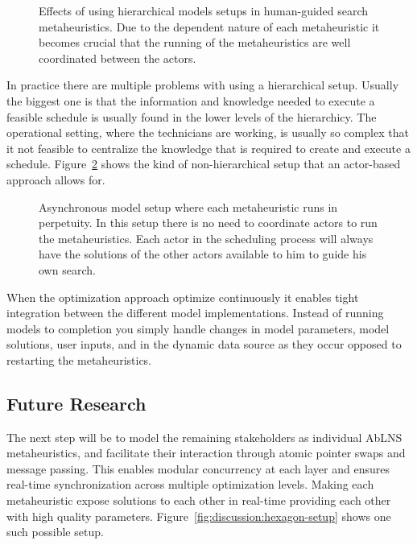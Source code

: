 \begin{figure}[H]
	\label{fig:discussion:hierarchical_model_setup}
	\caption{Effects of using hierarchical models setups in human-guided search metaheuristics.
	Due to the dependent nature of each metaheuristic it becomes crucial that the running of 
	the metaheuristics are well coordinated between the actors.}
\end{figure}

In practice there are multiple problems with using a hierarchical setup.
Usually the biggest one is that the information and knowledge needed to 
execute a feasible schedule is usually found in the lower levels of the 
hierarchicy. The operational setting, where the
technicians are working, is usually so complex that it not feasible to 
centralize the knowledge that is required to create and execute a 
schedule. Figure~\ref{fig:discussion:asynchronous_setup}
shows the kind of non-hierarchical setup that an actor-based approach 
allows for.

\begin{figure}[H]
	
	\caption{Asynchronous model setup where each metaheuristic runs in perpetuity. In this setup
		there is no need to coordinate actors to run the metaheuristics. Each actor in the 
		scheduling process will always have the solutions of the other actors available to 
		him to guide his own search.
	}\label{fig:discussion:asynchronous_setup}
\end{figure}

When the optimization approach optimize continuously it enables tight
integration between the different model implementations. Instead of running
models to completion you simply handle changes in model parameters, model
solutions, user inputs, and in the dynamic data source as they occur opposed to
restarting the metaheuristics.

\subsection{Future Research}\label{sec:discussion:future_research}
The next step will be to model the remaining stakeholders as individual AbLNS
metaheuristics, and facilitate their interaction through atomic pointer swaps
and message passing. This enables modular concurrency at each layer and ensures
real-time synchronization across multiple optimization levels. Making each
metaheuristic expose solutions to each  other in real-time providing each other
with high quality parameters.  Figure~\ref{fig:discussion:hexagon-setup} shows
one such possible setup.

